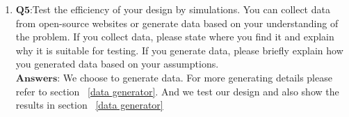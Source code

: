 \begin{enumerate}
    \item $\textbf{Q5:}$Test the efficiency of your design by simulations. You can collect data from open-source websites or generate data based on your understanding of the problem. If you collect data, please state where you find it and explain why it is suitable for testing. If you generate data, please briefly explain how you generated data based on your assumptions.\\
    $\textbf{Answers:}$ We choose to generate data. For more generating details please refer to section ~\ref{data generator}. And we test our design and also show the results in section ~\ref{data generator}
\end{enumerate}